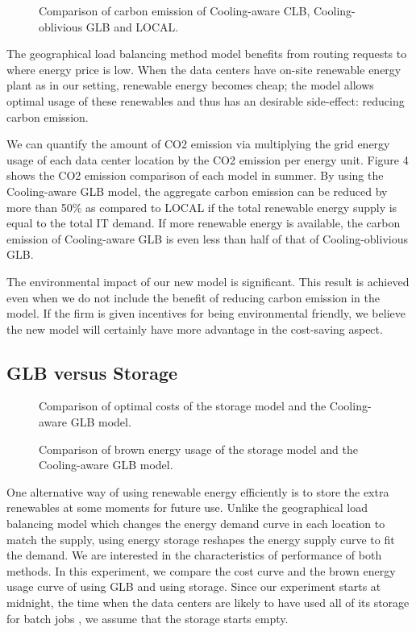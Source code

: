 \documentclass{acm_proc_article-sp}
\begin{document}
\begin{figure}
\centering
{}
\caption{Comparison of carbon emission of Cooling-aware CLB, Cooling-oblivious GLB and LOCAL.}
\end{figure}


The geographical load balancing method model benefits from routing requests to where energy price is low. When the data centers have on-site renewable energy plant as in our setting, renewable energy becomes cheap; the model allows optimal usage of these renewables and thus has an desirable side-effect: reducing carbon emission. 

We can quantify the amount of CO2 emission via multiplying the grid energy usage of each data center location by the CO2 emission per energy unit. Figure 4 shows the CO2 emission comparison of each model in summer. By using the Cooling-aware GLB model, the aggregate carbon emission can be reduced by more than 50\% as compared to LOCAL if the total renewable energy supply is equal to the total IT demand. If more renewable energy is available, the carbon emission of Cooling-aware GLB is even less than half of that of Cooling-oblivious GLB. 

The environmental impact of our new model is significant. This result is achieved even when we do not include the benefit of reducing carbon emission in the model. If the firm is given incentives for being environmental friendly, we believe the new model will certainly have more advantage in the cost-saving aspect.



\subsection{GLB versus Storage}

\begin{figure}
\centering
{}
\caption{Comparison of optimal costs of the storage model and the Cooling-aware GLB model.}
\end{figure}
\begin{figure}
\centering
{}
\caption{Comparison of brown energy usage of the storage model and the Cooling-aware GLB model.}
\end{figure}
One alternative way of using renewable energy efficiently is to store the extra renewables at some moments for future use. Unlike the geographical load balancing model which changes the energy demand curve in each location to match the supply, using energy storage reshapes the energy supply curve to fit the demand. We are interested in the characteristics of performance of both methods. In this experiment, we compare the cost curve and the brown energy usage curve of using GLB and using storage. Since our experiment starts at midnight, the time when the data centers are likely to have used all of its storage for batch jobs \cite{adam:cooling}, we assume that the storage starts empty. 
\end{document}
